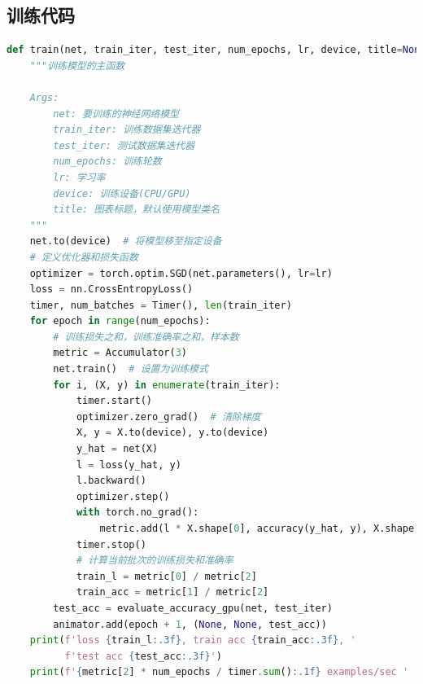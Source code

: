 \documentclass[UTF8]{ctexart}
\begin{document}
\subsection{训练代码}
\begin{lstlisting}[language=Python]
def train(net, train_iter, test_iter, num_epochs, lr, device, title=None):
    """训练模型的主函数
    
    Args:
        net: 要训练的神经网络模型
        train_iter: 训练数据集迭代器
        test_iter: 测试数据集迭代器 
        num_epochs: 训练轮数
        lr: 学习率
        device: 训练设备(CPU/GPU)
        title: 图表标题，默认使用模型类名
    """
    net.to(device)  # 将模型移至指定设备
    # 定义优化器和损失函数
    optimizer = torch.optim.SGD(net.parameters(), lr=lr)
    loss = nn.CrossEntropyLoss()
    timer, num_batches = Timer(), len(train_iter)
    for epoch in range(num_epochs):
        # 训练损失之和，训练准确率之和，样本数
        metric = Accumulator(3)
        net.train()  # 设置为训练模式
        for i, (X, y) in enumerate(train_iter):
            timer.start()
            optimizer.zero_grad()  # 清除梯度
            X, y = X.to(device), y.to(device)
            y_hat = net(X)
            l = loss(y_hat, y)
            l.backward()
            optimizer.step()
            with torch.no_grad():
                metric.add(l * X.shape[0], accuracy(y_hat, y), X.shape[0])
            timer.stop()
            # 计算当前批次的训练损失和准确率
            train_l = metric[0] / metric[2]
            train_acc = metric[1] / metric[2]
        test_acc = evaluate_accuracy_gpu(net, test_iter)
        animator.add(epoch + 1, (None, None, test_acc))
    print(f'loss {train_l:.3f}, train acc {train_acc:.3f}, '
          f'test acc {test_acc:.3f}')
    print(f'{metric[2] * num_epochs / timer.sum():.1f} examples/sec '
\end{lstlisting}
\end{document}
